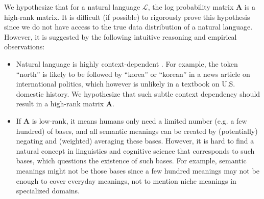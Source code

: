 We hypothesize that for a natural language $\mathcal{L}$, the log probability matrix $\mathbf{A}$ is a high-rank matrix. It is difficult (if possible) to rigorously prove this hypothesis since we do not have access to the true data distribution of a natural language. 
However, it is suggested by the following intuitive reasoning and empirical observations:
\begin{itemize}[leftmargin=1.5em,label=$\bullet$]
\item Natural language is highly context-dependent \citep{mikolov2012context}. For example, the token ``north'' is likely to be followed by ``korea'' or ``korean'' in a news article on international politics, which however is unlikely in a textbook on U.S. domestic history. We hypothesize that such subtle context dependency should result in a high-rank matrix $\mathbf{A}$.
\item If $\mathbf{A}$ is low-rank, it means humans only need a limited number (e.g. a few hundred) of bases, and all semantic meanings can be created by (potentially) negating and (weighted) averaging these bases. However, it is hard to find a natural concept in linguistics and cognitive science that corresponds to such bases, which questions the existence of such bases. For example, semantic meanings might not be those bases since a few hundred meanings may not be enough to cover everyday meanings, not to mention niche meanings in specialized domains.



\end{itemize}
